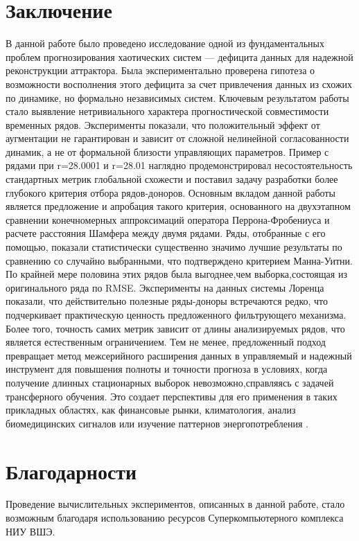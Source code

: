 \section{Заключение}

В данной работе было проведено исследование одной из фундаментальных проблем прогнозирования
 хаотических систем — дефицита данных для надежной реконструкции аттрактора. Была экспериментально
  проверена гипотеза о возможности восполнения этого дефицита за счет привлечения данных из схожих 
  по динамике, но формально независимых систем.
Ключевым результатом работы стало выявление нетривиального характера 
прогностической совместимости временных рядов. Эксперименты показали, 
что положительный эффект от аугментации не гарантирован и зависит от
 сложной нелинейной согласованности динамик, а не от формальной близости 
 управляющих параметров. Пример с рядами при 
r=28.0001 и 
r=28.01 наглядно продемонстрировал несостоятельность стандартных метрик
 глобальной схожести и поставил задачу разработки более глубокого критерия отбора рядов-доноров.
Основным вкладом данной работы является предложение и апробация такого 
критерия, основанного на двухэтапном сравнении конечномерных аппроксимаций оператора 
Перрона-Фробениуса и расчете расстояния Шамфера между двумя рядами. Ряды, отобранные с его помощью, показали 
статистически существенно значимо лучшие результаты по сравнению со случайно выбранными, что
 подтверждено критерием Манна-Уитни. По крайней мере половина этих рядов была выгоднее,чем  выборка,состоящая из оригинального ряда
  по RMSE. Эксперименты на данных системы
  Лоренца показали, что действительно полезные ряды-доноры встречаются редко, что подчеркивает практическую
   ценность предложенного фильтрующего механизма. Более того, точность самих метрик 
   зависит от длины анализируемых рядов, что является естественным ограничением. 
   Тем не менее, предложенный подход превращает метод межсерийного расширения данных
    в управляемый и надежный инструмент для повышения полноты и точности прогноза в
     условиях, когда получение длинных стационарных выборок невозможно,справляясь с задачей трансферного обучения.
    Это создает перспективы для его применения в таких прикладных областях, как
     финансовые рынки, климатология,
 анализ биомедицинских сигналов или изучение паттернов энергопотребления \cite{PerezChacon2018}.


 \section{Благодарности}
Проведение вычислительных экспериментов, описанных в данной работе, стало
 возможным благодаря использованию ресурсов Суперкомпьютерного комплекса НИУ ВШЭ.